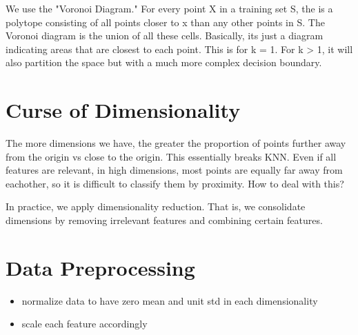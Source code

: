 We use the "Voronoi Diagram." For every point X in a training set S, the  is a polytope consisting of all points closer to x than any other points in S. The Voronoi diagram is the union of all these cells. Basically, its just a diagram indicating areas that are closest to each point. This is for k = 1. For k > 1, it will also partition the space but with a much more complex decision boundary.

\section{Curse of Dimensionality}
The more dimensions we have, the greater the proportion of points further away from the origin vs close to the origin. This essentially breaks KNN. Even if all features are relevant, in high dimensions, most points are equally far away from eachother, so it is difficult to classify them by proximity. How to deal with this?

In practice, we apply dimensionality reduction. That is, we consolidate dimensions by removing irrelevant features and combining certain features. 

\section{Data Preprocessing}
\begin{itemize}
    \item normalize data to have zero mean and unit std in each dimensionality
    \item scale each feature accordingly
\end{itemize}